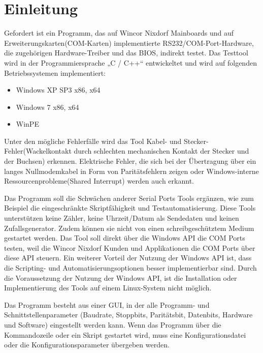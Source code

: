\chapter{Einleitung}
Gefordert ist ein Programm, das auf Wincor Nixdorf Mainboards und auf Erweiterungskarten(COM-Karten) implementierte RS232/COM-Port-Hardware, die zugehörigen Hardware-Treiber und das BIOS, indirekt testet. Das Testtool wird in der Programmiersprache „C / C++“ entwickeltet und wird auf folgenden Betriebssystemen implementiert:

\begin{itemize}
\item Windows XP SP3 x86, x64
\item Windows 7 x86, x64
\item  WinPE
\end{itemize}

Unter den mögliche Fehlerfälle wird das Tool Kabel- und Stecker-Fehler(Wackelkontakt durch schlechten mechanischen Kontakt der Stecker und der Buchsen) erkennen.
Elektrische Fehler, die sich bei der Übertragung über ein langes Nullmodemkabel in Form von Paritätsfehlern zeigen oder Windows-interne Ressourcenprobleme(Shared Interrupt) werden auch erkannt.

Das Programm soll die Schwächen anderer Serial Ports Tools ergänzen, wie zum Beispiel die eingeschränkte Skriptfähigkeit und Testautomatisierung. Diese Tools unterstützen keine Zähler, keine Uhrzeit/Datum als Sendedaten und keinen Zufallsgenerator. Zudem können sie nicht von einen schreibgeschütztem Medium gestartet werden. Das Tool soll direkt über die Windows API die COM Ports testen, weil die Wincor Nixdorf Kunden und Applikationen die COM Ports über diese API steuern. Ein weiterer Vorteil der Nutzung der Windows API ist, dass die Scripting- und Automatisierungsoptionen besser implementierbar sind. Durch die Voraussetzung der Nutzung der Windows API, ist die Installation oder Implementierung des Tools auf einem Linux-System nicht möglich.

Das Programm besteht aus einer GUI, in der alle Programm- und Schnittstellenparameter (Baudrate, Stoppbits, Paritätsbit, Datenbits, Hardware und Software) eingestellt werden kann. Wenn das Programm über die Kommandozeile oder ein Skript gestartet wird, muss eine Konfigurationsdatei oder die Konfigurationsparameter übergeben werden.